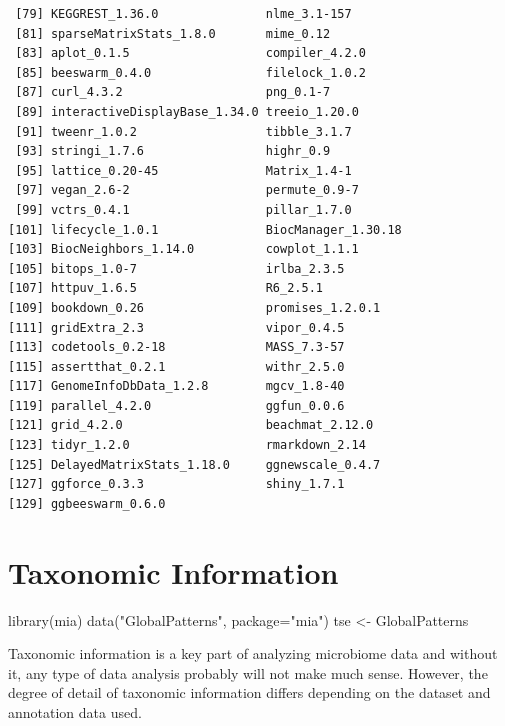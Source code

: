 \documentclass[
]{book}
\newenvironment{Shaded}{\begin{snugshade}}{\end{snugshade}}
\newcommand{\AttributeTok}[1]{\textcolor[rgb]{0.77,0.63,0.00}{#1}}
\newcommand{\FunctionTok}[1]{\textcolor[rgb]{0.00,0.00,0.00}{#1}}
\newcommand{\NormalTok}[1]{#1}
\newcommand{\OtherTok}[1]{\textcolor[rgb]{0.56,0.35,0.01}{#1}}
\newcommand{\StringTok}[1]{\textcolor[rgb]{0.31,0.60,0.02}{#1}}
\begin{document}
\begin{verbatim}
 [79] KEGGREST_1.36.0               nlme_3.1-157                 
 [81] sparseMatrixStats_1.8.0       mime_0.12                    
 [83] aplot_0.1.5                   compiler_4.2.0               
 [85] beeswarm_0.4.0                filelock_1.0.2               
 [87] curl_4.3.2                    png_0.1-7                    
 [89] interactiveDisplayBase_1.34.0 treeio_1.20.0                
 [91] tweenr_1.0.2                  tibble_3.1.7                 
 [93] stringi_1.7.6                 highr_0.9                    
 [95] lattice_0.20-45               Matrix_1.4-1                 
 [97] vegan_2.6-2                   permute_0.9-7                
 [99] vctrs_0.4.1                   pillar_1.7.0                 
[101] lifecycle_1.0.1               BiocManager_1.30.18          
[103] BiocNeighbors_1.14.0          cowplot_1.1.1                
[105] bitops_1.0-7                  irlba_2.3.5                  
[107] httpuv_1.6.5                  R6_2.5.1                     
[109] bookdown_0.26                 promises_1.2.0.1             
[111] gridExtra_2.3                 vipor_0.4.5                  
[113] codetools_0.2-18              MASS_7.3-57                  
[115] assertthat_0.2.1              withr_2.5.0                  
[117] GenomeInfoDbData_1.2.8        mgcv_1.8-40                  
[119] parallel_4.2.0                ggfun_0.0.6                  
[121] grid_4.2.0                    beachmat_2.12.0              
[123] tidyr_1.2.0                   rmarkdown_2.14               
[125] DelayedMatrixStats_1.18.0     ggnewscale_0.4.7             
[127] ggforce_0.3.3                 shiny_1.7.1                  
[129] ggbeeswarm_0.6.0             
\end{verbatim}

\hypertarget{taxonomic-information}{%
\chapter{Taxonomic Information}\label{taxonomic-information}}

\begin{Shaded}
\begin{Highlighting}[]
\FunctionTok{library}\NormalTok{(mia)}
\FunctionTok{data}\NormalTok{(}\StringTok{"GlobalPatterns"}\NormalTok{, }\AttributeTok{package=}\StringTok{"mia"}\NormalTok{)}
\NormalTok{tse }\OtherTok{\textless{}{-}}\NormalTok{ GlobalPatterns }
\end{Highlighting}
\end{Shaded}

Taxonomic information is a key part of analyzing microbiome data and without
it, any type of data analysis probably will not make much sense. However,
the degree of detail of taxonomic information differs depending on the dataset
and annotation data used.
\end{document}
